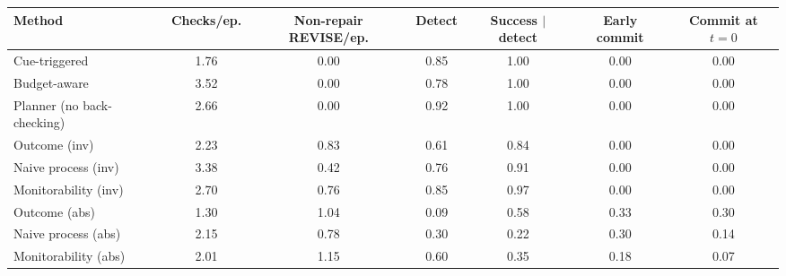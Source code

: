 \begin{tabular}{lcccccc}
\toprule
Method & Checks/ep. & Non-repair REVISE/ep. & Detect & Success $\mid$ detect & Early commit & Commit at $t{=}0$ \\
\midrule
Cue-triggered & 1.76 & 0.00 & 0.85 & 1.00 & 0.00 & 0.00 \\
Budget-aware & 3.52 & 0.00 & 0.78 & 1.00 & 0.00 & 0.00 \\
Planner (no back-checking) & 2.66 & 0.00 & 0.92 & 1.00 & 0.00 & 0.00 \\
Outcome (inv) & 2.23 & 0.83 & 0.61 & 0.84 & 0.00 & 0.00 \\
Naive process (inv) & 3.38 & 0.42 & 0.76 & 0.91 & 0.00 & 0.00 \\
Monitorability (inv) & 2.70 & 0.76 & 0.85 & 0.97 & 0.00 & 0.00 \\
Outcome (abs) & 1.30 & 1.04 & 0.09 & 0.58 & 0.33 & 0.30 \\
Naive process (abs) & 2.15 & 0.78 & 0.30 & 0.22 & 0.30 & 0.14 \\
Monitorability (abs) & 2.01 & 1.15 & 0.60 & 0.35 & 0.18 & 0.07 \\
\bottomrule
\end{tabular}
